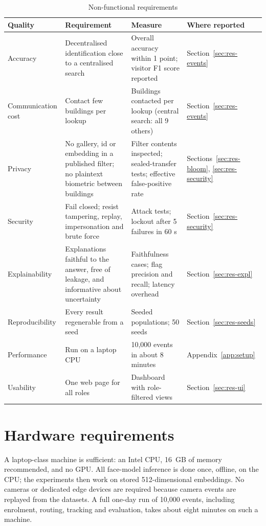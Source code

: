 \documentclass[12pt,a4paper,oneside]{report}
\begin{document}
\begin{table}[htbp]
\centering
\caption{Non-functional requirements}\label{tab:nfr}
{\small\setlength{\tabcolsep}{4pt}\renewcommand{\arraystretch}{1.2}
\begin{tabular}{|p{2.55cm}|p{5.19cm}|p{3.40cm}|p{2.83cm}|}\hline
\textbf{Quality} & \textbf{Requirement} & \textbf{Measure} & \textbf{Where reported}\\\hline
Accuracy & Decentralised identification close to a centralised search & Overall accuracy within 1 point; visitor F1 score reported & Section~\ref{sec:res-events}\\\hline
Communication cost & Contact few buildings per lookup & Buildings contacted per lookup (central search: all 9 others) & Section~\ref{sec:res-events}\\\hline
Privacy & No gallery, id or embedding in a published filter; no plaintext biometric between buildings & Filter contents inspected; sealed-transfer tests; effective false-positive rate & Sections~\ref{sec:res-bloom}, \ref{sec:res-security}\\\hline
Security & Fail closed; resist tampering, replay, impersonation and brute force & Attack tests; lockout after 5 failures in 60 s & Section~\ref{sec:res-security}\\\hline
Explainability & Explanations faithful to the answer, free of leakage, and informative about uncertainty & Faithfulness cases; flag precision and recall; latency overhead & Section~\ref{sec:res-expl}\\\hline
Reproducibility & Every result regenerable from a seed & Seeded populations; 50 seeds & Section~\ref{sec:res-seeds}\\\hline
Performance & Run on a laptop CPU & 10,000 events in about 8 minutes & Appendix~\ref{app:setup}\\\hline
Usability & One web page for all roles & Dashboard with role-filtered views & Section~\ref{sec:res-ui}\\\hline
\end{tabular}}
\end{table}

\section{Hardware requirements}
A laptop-class machine is sufficient: an Intel CPU, 16~GB of memory recommended, and no GPU. All face-model inference is done once, offline, on the CPU; the experiments then work on stored 512-dimensional embeddings. No cameras or dedicated edge devices are required because camera events are replayed from the datasets. A full one-day run of 10,000 events, including enrolment, routing, tracking and evaluation, takes about eight minutes on such a machine.
\end{document}
